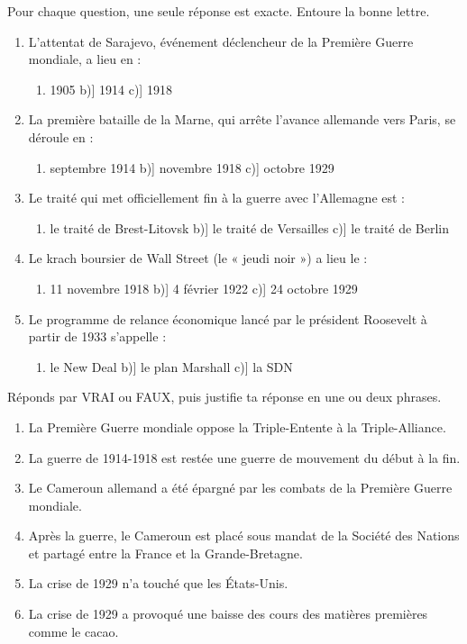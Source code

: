 \documentclass[11pt]{article}
\begin{document}
\begin{exercice}
Pour chaque question, une seule réponse est exacte. Entoure la bonne lettre.
\begin{enumerate}
\item L'attentat de Sarajevo, événement déclencheur de la Première Guerre mondiale, a lieu en :
\begin{enumerate}
\item[a)] 1905 \quad b)] 1914 \quad c)] 1918
\end{enumerate}
\item La première bataille de la Marne, qui arrête l'avance allemande vers Paris, se déroule en :
\begin{enumerate}
\item[a)] septembre 1914 \quad b)] novembre 1918 \quad c)] octobre 1929
\end{enumerate}
\item Le traité qui met officiellement fin à la guerre avec l'Allemagne est :
\begin{enumerate}
\item[a)] le traité de Brest-Litovsk \quad b)] le traité de Versailles \quad c)] le traité de Berlin
\end{enumerate}
\item Le krach boursier de Wall Street (le « jeudi noir ») a lieu le :
\begin{enumerate}
\item[a)] 11 novembre 1918 \quad b)] 4 février 1922 \quad c)] 24 octobre 1929
\end{enumerate}
\item Le programme de relance économique lancé par le président Roosevelt à partir de 1933 s'appelle :
\begin{enumerate}
\item[a)] le New Deal \quad b)] le plan Marshall \quad c)] la SDN
\end{enumerate}
\end{enumerate}
\end{exercice}

\begin{exercice}
Réponds par VRAI ou FAUX, puis justifie ta réponse en une ou deux phrases.
\begin{enumerate}
\item La Première Guerre mondiale oppose la Triple-Entente à la Triple-Alliance.
\item La guerre de 1914-1918 est restée une guerre de mouvement du début à la fin.
\item Le Cameroun allemand a été épargné par les combats de la Première Guerre mondiale.
\item Après la guerre, le Cameroun est placé sous mandat de la Société des Nations et partagé entre la France et la Grande-Bretagne.
\item La crise de 1929 n'a touché que les États-Unis.
\item La crise de 1929 a provoqué une baisse des cours des matières premières comme le cacao.
\end{enumerate}
\end{exercice}
\end{document}
